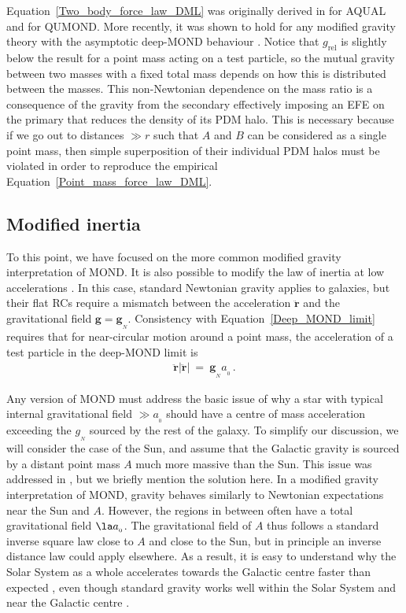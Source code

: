 \documentclass[fleqn,usenatbib,useAMS]{mnras} %
\begin{document}
Equation~\ref{Two_body_force_law_DML} was originally derived in \citet{Milgrom_1994_virial} for AQUAL and \citet{QUMOND} for QUMOND. More recently, it was shown to hold for any modified gravity theory with the asymptotic deep-MOND behaviour \citep{Milgrom_2014}. Notice that $g_\text{rel}$ is slightly below the result for a point mass acting on a test particle, so the mutual gravity between two masses with a fixed total mass depends on how this is distributed between the masses. This non-Newtonian dependence on the mass ratio is a consequence of the gravity from the secondary effectively imposing an EFE on the primary that reduces the density of its PDM halo. This is necessary because if we go out to distances $\gg r$ such that $A$ and $B$ can be considered as a single point mass, then simple superposition of their individual PDM halos must be violated in order to reproduce the empirical Equation~\ref{Point_mass_force_law_DML}.



\subsection{Modified inertia}
\label{Modified_inertia}

To this point, we have focused on the more common modified gravity interpretation of MOND. It is also possible to modify the law of inertia at low accelerations \citep{Milgrom_1994}. In this case, standard Newtonian gravity applies to galaxies, but their flat RCs require a mismatch between the acceleration $\ddot{\bm{r}}$ and the gravitational field $\bm{g} = \bm{g}_{_N}$. Consistency with Equation~\ref{Deep_MOND_limit} requires that for near-circular motion around a point mass, the acceleration of a test particle in the deep-MOND limit is
\begin{eqnarray}
	\ddot{\bm{r}}  \left| \ddot{\bm{r}} \right| ~=~ \bm{g}_{_N} a_{_0} \, .
\end{eqnarray}

Any version of MOND must address the basic issue of why a star with typical internal gravitational field $\gg a_{_0}$ should have a centre of mass acceleration exceeding the $g_{_N}$ sourced by the rest of the galaxy. To simplify our discussion, we will consider the case of the Sun, and assume that the Galactic gravity is sourced by a distant point mass $A$ much more massive than the Sun. This issue was addressed in \citet{Bekenstein_Milgrom_1984}, but we briefly mention the solution here. In a modified gravity interpretation of MOND, gravity behaves similarly to Newtonian expectations near the Sun and $A$. However, the regions in between often have a total gravitational field $\la a_{_0}$. The gravitational field of $A$ thus follows a standard inverse square law close to $A$ and close to the Sun, but in principle an inverse distance law could apply elsewhere. As a result, it is easy to understand why the Solar System as a whole accelerates towards the Galactic centre faster than expected \citep{McGaugh_2018, Klioner_2021}, even though standard gravity works well within the Solar System \citep{Hees_2014, Hees_2016} and near the Galactic centre \citep{Gravity_2018, Gravity_2020}.
\end{document}
